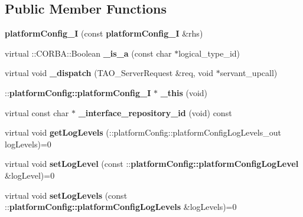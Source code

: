 \subsection*{Public Member Functions}
\begin{DoxyCompactItemize}
\item 
{\bfseries platform\+Config\+\_\+I} (const {\bf platform\+Config\+\_\+I} \&rhs)\label{classPOA__platformConfig_1_1platformConfig__I_a5cb9d3b396067589b4300f2bc1533eba}

\item 
virtual \+::C\+O\+R\+B\+A\+::\+Boolean {\bfseries \+\_\+is\+\_\+a} (const char $\ast$logical\+\_\+type\+\_\+id)\label{classPOA__platformConfig_1_1platformConfig__I_a081f93f6a02e476d4e2af19dd8b194d2}

\item 
virtual void {\bfseries \+\_\+dispatch} (T\+A\+O\+\_\+\+Server\+Request \&req, void $\ast$servant\+\_\+upcall)\label{classPOA__platformConfig_1_1platformConfig__I_aeb34c172b8cbeb48ca2b6fb66838ef13}

\item 
\+::{\bf platform\+Config\+::platform\+Config\+\_\+I} $\ast$ {\bfseries \+\_\+this} (void)\label{classPOA__platformConfig_1_1platformConfig__I_a0a525c595f1c4a7975fa6ea6eaafb1d9}

\item 
virtual const char $\ast$ {\bfseries \+\_\+interface\+\_\+repository\+\_\+id} (void) const \label{classPOA__platformConfig_1_1platformConfig__I_aaeb1f3493a93475341d6a8d8a63ea809}

\item 
virtual void {\bfseries get\+Log\+Levels} (\+::platform\+Config\+::platform\+Config\+Log\+Levels\+\_\+out log\+Levels)=0\label{classPOA__platformConfig_1_1platformConfig__I_a090bdeecb4263ce090220eaaf4b90211}

\item 
virtual void {\bfseries set\+Log\+Level} (const \+::{\bf platform\+Config\+::platform\+Config\+Log\+Level} \&log\+Level)=0\label{classPOA__platformConfig_1_1platformConfig__I_a2da881d1845f31aec1d847c124471e88}

\item 
virtual void {\bfseries set\+Log\+Levels} (const \+::{\bf platform\+Config\+::platform\+Config\+Log\+Levels} \&log\+Levels)=0\label{classPOA__platformConfig_1_1platformConfig__I_a5c1ce64da66c8e4d85b65e173dbe5f2f}

\end{DoxyCompactItemize}
